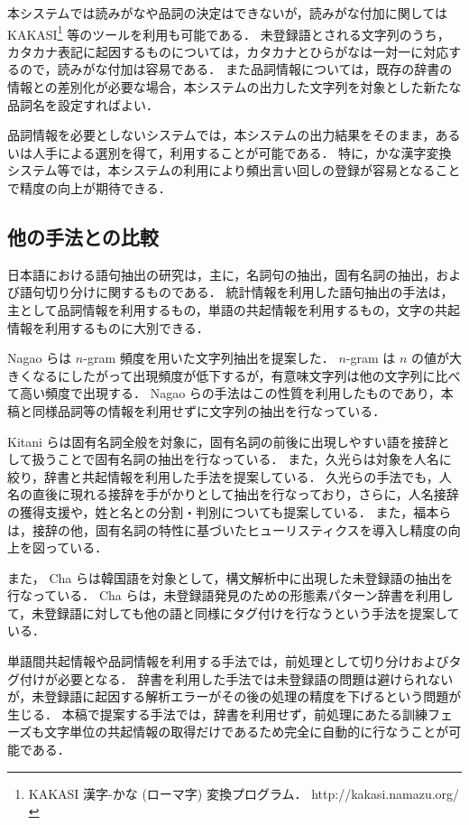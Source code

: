 本システムでは読みがなや品詞の決定はできないが，読みがな付加に関しては KAKASI\footnote{KAKASI 漢字-かな (ローマ字) 変換プログラム． http://kakasi.namazu.org/} 等のツールを利用も可能である．
未登録語とされる文字列のうち，カタカナ表記に起因するものについては，カタカナとひらがなは一対一に対応するので，読みがな付加は容易である．
また品詞情報については，既存の辞書の情報との差別化が必要な場合，本システムの出力した文字列を対象とした新たな品詞名を設定すればよい．

品詞情報を必要としないシステムでは，本システムの出力結果をそのまま，あるいは人手による選別を得て，利用することが可能である．
特に，かな漢字変換システム等では，本システムの利用により頻出言い回しの登録が容易となることで精度の向上が期待できる．
\subsection{他の手法との比較}
\label{sec:comparison}
日本語における語句抽出の研究は，主に，名詞句の抽出，固有名詞の抽出，および語句切り分けに関するものである．
統計情報を利用した語句抽出の手法は，主として品詞情報を利用するもの，単語の共起情報を利用するもの，文字の共起情報を利用するものに大別できる．

Nagao らは $n$-gram 頻度を用いた文字列抽出を提案した\cite{nagao94}．
$n$-gram は $n$ の値が大きくなるにしたがって出現頻度が低下するが，有意味文字列は他の文字列に比べて高い頻度で出現する．
Nagao らの手法はこの性質を利用したものであり，本稿と同様品詞等の情報を利用せずに文字列の抽出を行なっている．

Kitani らは固有名詞全般を対象に，固有名詞の前後に出現しやすい語を接辞として扱うことで固有名詞の抽出を行なっている\cite{kitani94}．
また，久光らは対象を人名に絞り，辞書と共起情報を利用した手法を提案している\cite{hisamitsu97}．
久光らの手法でも，人名の直後に現れる接辞を手がかりとして抽出を行なっており，さらに，人名接辞の獲得支援や，姓と名との分割・判別についても提案している．
また，福本らは，接辞の他，固有名詞の特性に基づいたヒューリスティクスを導入し精度の向上を図っている\cite{fukumoto98}．

また， Cha らは韓国語を対象として，構文解析中に出現した未登録語の抽出を行なっている\cite{cha98}．
Cha らは，未登録語発見のための形態素パターン辞書を利用して，未登録語に対しても他の語と同様にタグ付けを行なうという手法を提案している．

単語間共起情報や品詞情報を利用する手法では，前処理として切り分けおよびタグ付けが必要となる．
辞書を利用した手法では未登録語の問題は避けられないが，未登録語に起因する解析エラーがその後の処理の精度を下げるという問題が生じる．
本稿で提案する手法では，辞書を利用せず，前処理にあたる訓練フェーズも文字単位の共起情報の取得だけであるため完全に自動的に行なうことが可能である．
